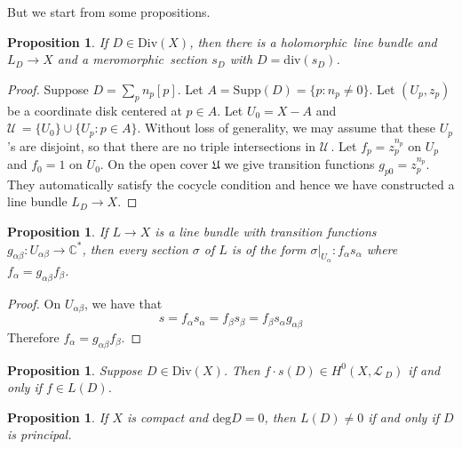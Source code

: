 \documentclass[12pt]{article}
\theoremstyle{plain}
\newtheorem{proposition}[equation]{Proposition}
\theoremstyle{definition}
\newcommand{\fU}{\mathfrak{U}}
\newcommand{\sL}{\mathcal{L}\,}
\newcommand{\sU}{\mathcal{U}\,}
\newcommand{\IC}{\mathbb{C}}
\renewcommand{\deg}{\mathrm{deg}}
\newcommand{\<}{\langle}
\renewcommand{\>}{\rangle}
\newcommand{\Div}{\mathrm{Div}}
\renewcommand{\div}{\mathrm{div}}
\newcommand{\holo}{holomorphic \,}
\newcommand{\mero}{meromorphic \,}
\newcommand{\Supp}{\mathrm{Supp}}
\begin{document}
But we start from some propositions. 
\begin{proposition}
If $D \in \Div(X)$, then there is a \holo line bundle and $L_D \to X$ and a \mero section $s_D$ with $D = \div(s_D)$. 
\end{proposition}
\begin{proof}
Suppose $D = \sum_p n_p [p]$. Let $ A = \Supp(D) = \{ p : n_p \neq 0 \}$. Let $(U_p, z_p)$ be a coordinate disk centered at $p \in A$. Let $U_0 = X - A$ and $\sU = \{ U_0 \} \cup \{ U_p : p \in A \}$. Without loss of generality, we may assume that these $U_p$'s are disjoint, so that there are no triple intersections in $\sU$. Let $f_p = z_p^{n_p}$ on $U_p$ and $f_0 = 1$ on $U_0$. On the open cover $\fU$ we give transition functions $g_{p0} = z_p^{n_p}$. They automatically satisfy the cocycle condition and hence we have constructed a line bundle $L_D \to X$. 
\end{proof}

\begin{proposition}
If $L \to X$ is a line bundle with transition functions $g_{\alpha \beta} : U_{\alpha \beta} \to \IC^*$, then every section $\sigma$ of $L$ is of the form $\sigma|_{U_\alpha} : f_\alpha s_\alpha$ where $f_\alpha = g_{\alpha \beta} f_\beta$. 
\end{proposition}
\begin{proof}
On $U_{\alpha \beta}$, we have that 
$$ s = f_\alpha s_\alpha = f_\beta s_\beta = f_\beta s_\alpha g_{\alpha \beta} $$
Therefore $f_\alpha = g_{\alpha \beta} f_\beta$. 
\end{proof}


\begin{proposition}
Suppose $D \in \Div(X)$. Then $f \cdot s(D) \in H^0(X, \sL_D)$ if and only if $f \in L(D)$.
\end{proposition}



\begin{proposition}
If $X$ is compact and $\deg D = 0$, then $L(D) \neq 0$ if and only if $D$ is principal. 
\end{proposition}
\end{document}

